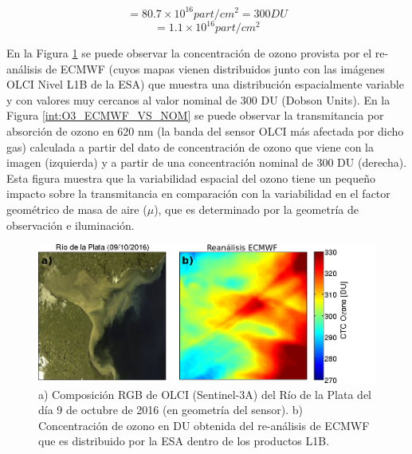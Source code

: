     \begin{equation}
        [O_{3}] = 80.7\times10^{16} part/cm^{2} = 300 DU
        \label{int:eq:conc_o3}
    \end{equation}
    \begin{equation}
        [NO_{2}] = 1.1 \times10^{16} part/cm^{2}
        \label{int:eq:conc_no2}
    \end{equation}

    En la Figura \ref{int:O3_RDP_ECMWF} se puede observar la concentración de ozono provista por el re-análisis de ECMWF (cuyos mapas vienen distribuidos junto con las imágenes OLCI Nivel L1B de la ESA) que muestra una distribución espacialmente variable y con valores muy cercanos al valor nominal de 300 DU (Dobson Units). En la Figura \ref{int:O3_ECMWF_VS_NOM} se puede observar la transmitancia por absorción de ozono en 620 nm (la banda del sensor OLCI más afectada por dicho gas) calculada a partir del dato de concentración de ozono que viene con la imagen (izquierda) y a partir de una concentración nominal de 300 DU (derecha). Esta figura muestra que la variabilidad espacial del ozono tiene un pequeño impacto sobre la transmitancia en comparación con la variabilidad en el factor geométrico de masa de aire ($\mu$), que es determinado por la geometría de observación e iluminación.

    \begin{figure}
    \centering
    \includegraphics[width=\textwidth]{int/figures/O3_RDP_ECMWF.png}
    \caption[Concentración de ozono en DU obtenida del re-análisis de ECMWF para el RdP el día 09-OCT-2016.]{a) Composición RGB de OLCI (Sentinel-3A) del Río de la Plata del día 9 de octubre de 2016 (en geometría del sensor). b) Concentración de ozono en DU obtenida del re-análisis de ECMWF que es distribuido por la ESA dentro de los productos L1B.}
    \label{int:O3_RDP_ECMWF}
    \end{figure}

